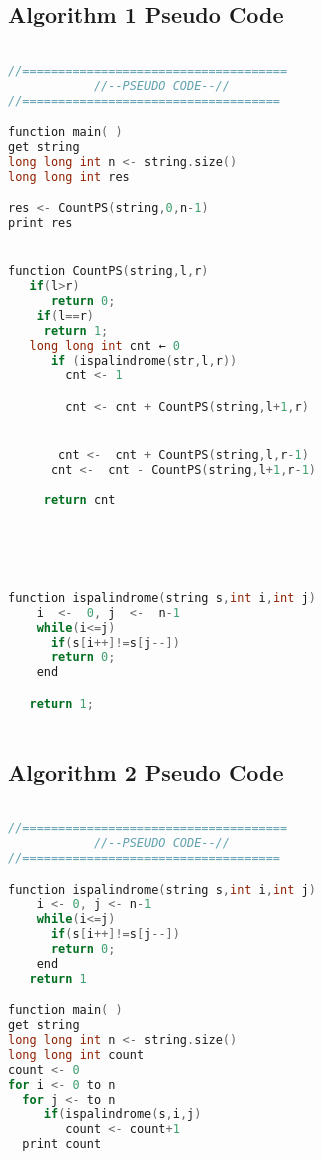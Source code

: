 \documentclass[conference]{IEEEtran}
\begin{document}
\bigskip\subsection{Algorithm 1 Pseudo Code}\label{AA}



\begin{lstlisting}[caption=Algorithm 1, style=chstyle, language=c]

//=====================================
            //--PSEUDO CODE--//
//====================================

function main( )
get string 
long long int n <- string.size()
long long int res

res <- CountPS(string,0,n-1)
print res


function CountPS(string,l,r)
   if(l>r)
	  return 0;
	if(l==r)
     return 1;
   long long int cnt ← 0
      if (ispalindrome(str,l,r))
	    cnt <- 1

        cnt <- cnt + CountPS(string,l+1,r)


       cnt <-  cnt + CountPS(string,l,r-1)
      cnt <-  cnt - CountPS(string,l+1,r-1)
      
     return cnt





function ispalindrome(string s,int i,int j)
    i  <-  0, j  <-  n-1
    while(i<=j)
	  if(s[i++]!=s[j--])
	  return 0;
    end

   return 1;



\end{lstlisting}



\bigskip\subsection{Algorithm 2 Pseudo Code}\label{AA}



\begin{lstlisting}[caption=Algorithm 2, style=chstyle, language=c++]

//=====================================
            //--PSEUDO CODE--//
//====================================

function ispalindrome(string s,int i,int j)
    i <- 0, j <- n-1
    while(i<=j)
	  if(s[i++]!=s[j--])
	  return 0;
    end
   return 1

function main( )
get string 
long long int n <- string.size()
long long int count
count <- 0
for i <- 0 to n
  for j <- to n
     if(ispalindrome(s,i,j)
        count <- count+1 
  print count




\end{lstlisting}
\end{document}
